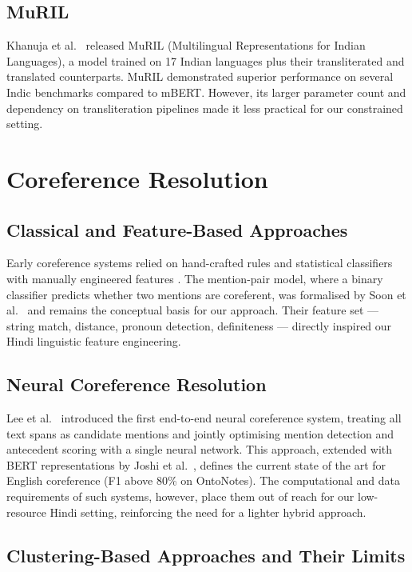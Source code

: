 \documentclass[12pt,a4paper]{report}
\begin{document}
\subsection{MuRIL}

Khanuja et al.\ \cite{khanuja2021muril} released MuRIL (Multilingual Representations for Indian Languages), a model trained on 17 Indian languages plus their transliterated and translated counterparts. MuRIL demonstrated superior performance on several Indic benchmarks compared to mBERT. However, its larger parameter count and dependency on transliteration pipelines made it less practical for our constrained setting.

\section{Coreference Resolution}

\subsection{Classical and Feature-Based Approaches}

Early coreference systems relied on hand-crafted rules and statistical classifiers with manually engineered features \cite{lappin1994algorithm}. The mention-pair model, where a binary classifier predicts whether two mentions are coreferent, was formalised by Soon et al.\ \cite{soon2001machine} and remains the conceptual basis for our approach. Their feature set --- string match, distance, pronoun detection, definiteness --- directly inspired our Hindi linguistic feature engineering.

\subsection{Neural Coreference Resolution}

Lee et al.\ \cite{lee2017end} introduced the first end-to-end neural coreference system, treating all text spans as candidate mentions and jointly optimising mention detection and antecedent scoring with a single neural network. This approach, extended with BERT representations by Joshi et al.\ \cite{joshi2019bert}, defines the current state of the art for English coreference (F1 above 80\% on OntoNotes). The computational and data requirements of such systems, however, place them out of reach for our low-resource Hindi setting, reinforcing the need for a lighter hybrid approach.

\subsection{Clustering-Based Approaches and Their Limits}
\end{document}
